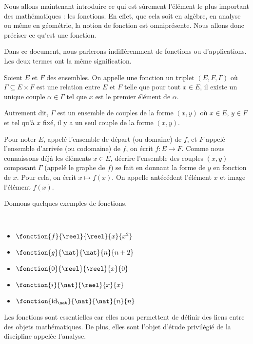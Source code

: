 Nous allons maintenant introduire ce qui est sûrement l'élément le plus important des mathématiques : les fonctions. En effet, que cela soit en algèbre, en analyse ou même en géométrie, la notion de fonction est omniprésente. Nous allons donc préciser ce qu'est une fonction.

\begin{rmk}
    Dans ce document, nous parlerons indifféremment de fonctions ou d'applications. Les deux termes ont la même signification.
\end{rmk}

\begin{defi}[Fonction]
    Soient $E$ et $F$ des ensembles. On appelle une fonction un triplet $(E,F,\Gamma)$ où $\Gamma\subseteq E\times F$ est une relation entre $E$ et $F$ telle que pour tout $x\in E$, il existe un unique couple $\alpha\in\Gamma$ tel que $x$ est le premier élément de $\alpha$.
    
    Autrement dit, $\Gamma$ est un ensemble de couples de la forme $(x,y)$ où $x\in E$, $y\in F$ et tel qu'à $x$ fixé, il y a un seul couple de la forme $(x,y)$.
    
    Pour noter $E$, appelé l'ensemble de départ (ou domaine) de $f$, et $F$ appelé l'ensemble d'arrivée (ou codomaine) de $f$, on écrit $f : E \to F$. Comme nous connaissons déjà les éléments $x\in E$, décrire l'ensemble des couples $(x,y)$ composant $\Gamma$ (appelé le graphe de $f$) se fait en donnant la forme de $y$ en fonction de $x$. Pour cela, on écrit $x\mapsto f(x)$. On appelle antécédent l'élément $x$ et image l'élément $f(x)$.
\end{defi}

Donnons quelques exemples de fonctions.

\begin{expl}
    \ 
    \begin{itemize}[label=$\bullet$]
        \item $\fonction{f}{\reel}{\reel}{x}{x^2}$
        \item $\fonction{g}{\nat}{\nat}{n}{n+2}$
        \item $\fonction{0}{\reel}{\reel}{x}{0}$
        \item $\fonction{i}{\nat}{\reel}{x}{x}$
        \item $\fonction{\mathrm{id}_\nat}{\nat}{\nat}{n}{n}$
    \end{itemize}
\end{expl}

Les fonctions sont essentielles car elles nous permettent de définir des liens entre des objets mathématiques. De plus, elles sont l'objet d'étude privilégié de la discipline appelée l'analyse.

